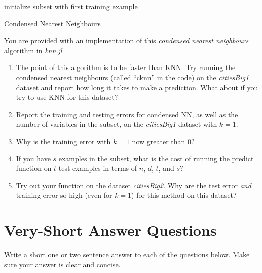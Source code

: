 \documentclass{article}
\def\blu#1{{\color{blu}#1}}
\def\enum#1{\begin{enumerate}#1\end{enumerate}}
\begin{document}
\begin{algorithm}[H]
 initialize subset with first training example\;
 \caption{Condensed Nearest Neighbours}
\end{algorithm}
You are provided with an implementation of this \emph{condensed nearest neighbours} algorithm in \emph{knn.jl}. 
\blu{
\enum{
\item The point of this algorithm is to be faster than KNN. Try running the condensed nearest neighbours (called ``cknn'' in the code) on the \emph{citiesBig1} dataset and report how long it takes to make a prediction. What about if you try to use KNN for this dataset?
\item Report the training and testing errors for condensed NN, as well as the number of variables in the subset, on the \emph{citiesBig1} dataset with $k=1$.
\item Why is the training error with $k=1$ now greater than $0$?
\item If you have $s$ examples in the subset, what is the cost of running the predict function on $t$ test examples in terms of $n$, $d$, $t$, and $s$?
\item Try out your function on the dataset \emph{citiesBig2}. Why are the  test error \emph{and} training error so high (even for $k=1$) for this method on this dataset?
}
}


\section{Very-Short Answer Questions}

\blu{Write a short one or two sentence answer to each of the questions below}. Make sure your answer is clear and concise.
\end{document}
